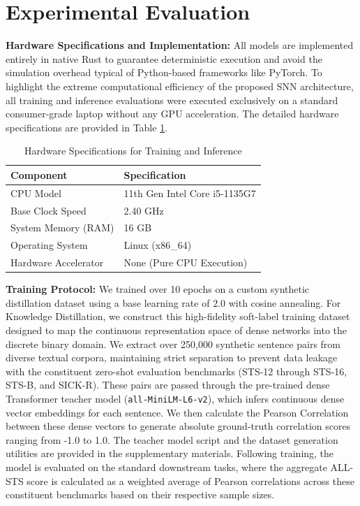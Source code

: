 \documentclass[final]{clv2025}
\begin{document}
\section{Experimental Evaluation}

\textbf{Hardware Specifications and Implementation:} All models are implemented entirely in native Rust to guarantee deterministic execution and avoid the simulation overhead typical of Python-based frameworks like PyTorch. To highlight the extreme computational efficiency of the proposed SNN architecture, all training and inference evaluations were executed exclusively on a standard consumer-grade laptop without any GPU acceleration. The detailed hardware specifications are provided in Table \ref{tab:hardware_specs}.

\begin{table}[t!]
\caption{Hardware Specifications for Training and Inference}
\label{tab:hardware_specs}
\begin{tabular}{ll}
\toprule
\textbf{Component} & \textbf{Specification} \\
\midrule
CPU Model & 11th Gen Intel Core i5-1135G7 \\
Base Clock Speed & 2.40 GHz \\
System Memory (RAM) & 16 GB \\
Operating System & Linux (x86\_64) \\
Hardware Accelerator & None (Pure CPU Execution) \\
\bottomrule
\end{tabular}
\end{table}

\textbf{Training Protocol:} We trained over 10 epochs on a custom synthetic distillation dataset using a base learning rate of $2.0$ with cosine annealing. For Knowledge Distillation, we construct this high-fidelity soft-label training dataset designed to map the continuous representation space of dense networks into the discrete binary domain. We extract over 250,000 synthetic sentence pairs from diverse textual corpora, maintaining strict separation to prevent data leakage with the constituent zero-shot evaluation benchmarks (STS-12 through STS-16, STS-B, and SICK-R). These pairs are passed through the pre-trained dense Transformer teacher model (\texttt{all-MiniLM-L6-v2}), which infers continuous dense vector embeddings for each sentence. We then calculate the Pearson Correlation between these dense vectors to generate absolute ground-truth correlation scores ranging from -1.0 to 1.0. The teacher model script and the dataset generation utilities are provided in the supplementary materials. Following training, the model is evaluated on the standard downstream tasks, where the aggregate ALL-STS score is calculated as a weighted average of Pearson correlations across these constituent benchmarks based on their respective sample sizes.
\end{document}
